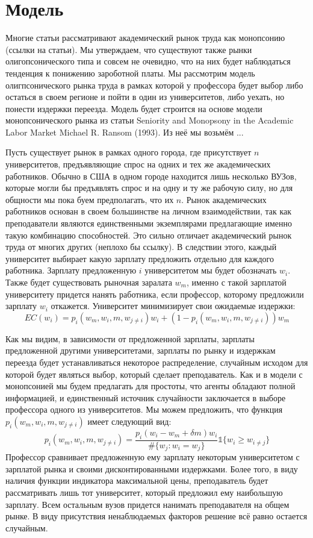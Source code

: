\documentclass[a4paper, 12pt]{article}
\theoremstyle{definition}
\theoremstyle{plain}
\begin{document}
\section{Модель}

Многие статьи рассматривают академический рынок труда  как монопсонию (ссылки на статьи). Мы утверждаем, что существуют также рынки олигопсонического типа и совсем не очевидно, что на них будет наблюдаться тенденция к понижению зароботной платы.  Мы рассмотрим модель олигпсонического рынка труда в рамках которой у профессора будет выбор либо остаться в своем регионе и пойти в один из университетов, либо уехать, но понести издержки переезда. Модель будет строится на основе модели монопсонического рынка из статьи Seniority and Monopsony in the Academic Labor Market
Michael R. Ransom (1993). Из неё мы возьмём ...  

Пусть существует рынок в рамках одного города, где присутствует $n$ университетов, предъявляющие спрос на одних и тех же академических работников. Обычно в США в одном городе находится лишь несколько ВУЗов, которые могли бы предъявлять спрос и на одну и ту же рабочую силу, но для общности мы пока буем предполагать, что их $n$. Рынок академических работников основан в своем большинстве на личном взаимодействии, так как преподаватели являются единственными экземплярами предлагающие именно такую комбинацию способностей. Это сильно отличает академический рынок труда от многих других (неплохо бы ссылку). В следствии этого, каждый университет выбирает какую зарплату предложить отдельно для каждого работника. Зарплату предложенную $i$ университетом мы будет обозначать $w_i$. Также будет существовать рыночная заралата $w_m$, именно с такой зарплатой университету придется нанять работника, если профессор, которому предложили зарплату $w_i$ откажется. Университет минимизирует свои ожидаемые издержки: 
\[
EC(w_i) = p_i(w_m, w_i, m, w_{j \neq i})w_i + (1 - p_i(w_m, w_i, m, w_{j \neq i}))w_m
\]

Как мы видим, в зависимости от предложенной зарплаты, зарплаты предложенной другими университетами, зарплаты по рынку и издержкам переезда будет устанавливаться некоторое распределение, случайным исходом для которой будет являться выбор, который сделает преподаватель. Как и в модели с монопсонией мы будем предлагать для простоты, что агенты обладают полной информацией, и единственный источник случайности заключается в выборе профессора одного из университетов. Мы можем предложить, что функция $p_i ( w_m, w_i, m, w_{j \neq i}) $ имеет следующий вид: 
\[
p_i( w_m, w_i, m, w_{j \neq i}) = \frac{p_i(w_i - w_m + \delta m) w_i}{\#\{w_j : w_i = w_j\}}\mathds{1} \{ w_i \geq w_ {i \neq j}\}
\]
Профессор сравнивает предложенную ему зарплату некоторым университетом с зарплатой рынка и своими дисконтированными издержками. Более того, в виду наличия функции индикатора максимальной цены, преподаватель будет рассматривать лишь тот университет, который предложил ему наибольшую зарплату. Всем остальным вузов придется нанимать преподавателя на общем рынке. В виду присутствия ненаблюдаемых факторов решение всё равно остается случайным. 
\end{document}
